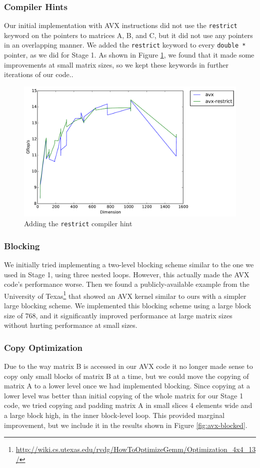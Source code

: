 \documentclass[letterpaper]{article}	 %
\begin{document}
\subsubsection{Compiler Hints}
Our initial implementation with AVX instructions did not use the \texttt{restrict} keyword on the pointers to matrices A, B, and C, but it did not use any pointers in an overlapping manner. We added the \texttt{restrict} keyword to every \texttt{double *} pointer, as we did for Stage 1. As shown in Figure \ref{fig:avx-restrict}, we found that it made some improvements at small matrix sizes, so we kept these keywords in further iterations of our code.. 

\begin{figure}[H]
	\centering
	\includegraphics[width=.6\linewidth]{timing-restrict.pdf}
	\caption{Adding the \texttt{restrict} compiler hint}
	\label{fig:avx-restrict}
\end{figure}

\subsubsection{Blocking}
We initially tried implementing a two-level blocking scheme similar to the one we used in Stage 1, using three nested loops. However, this actually made the AVX code's performance worse. Then we found a publicly-available example from the University of Texas\footnote{\url{http://wiki.cs.utexas.edu/rvdg/HowToOptimizeGemm/Optimization\_4x4\_13/}} that showed an AVX kernel similar to ours with a simpler large blocking scheme. We implemented this blocking scheme using a large block size of 768, and it significantly improved performance at large matrix sizes without hurting performance at small sizes.


\subsubsection{Copy Optimization}
Due to the way matrix B is accessed in our AVX code it no longer made sense to copy only small blocks of matrix B at a time, but we could move the copying of matrix A to a lower level once we had implemented blocking. Since copying at a lower level was better than initial copying of the whole matrix for our Stage 1 code, we tried copying and padding matrix A in small slices 4 elements wide and a large block high, in the inner block-level loop. This provided marginal improvement, but we include it in the results shown in Figure \ref{fig:avx-blocked}.
\end{document}
